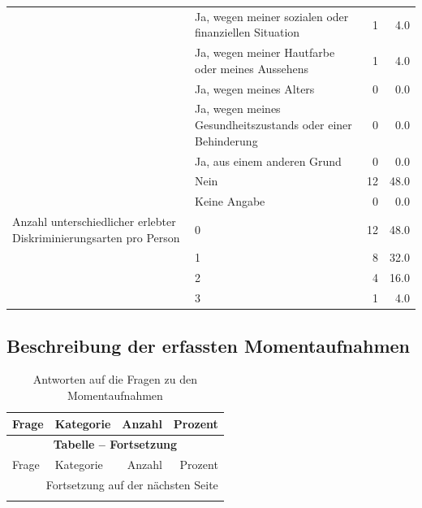 \begin{appendices}
\begin{longtable}{p{5.5cm}p{5.5cm}rr}
     & Ja, wegen meiner sozialen oder finanziellen Situation & 1 & 4.0 \\*
     & Ja, wegen meiner Hautfarbe oder meines Aussehens & 1 & 4.0 \\*
     & Ja, wegen meines Alters & 0 & 0.0 \\*
     & Ja, wegen meines Gesundheitszustands oder einer Behinderung & 0 & 0.0 \\*
     & Ja, aus einem anderen Grund & 0 & 0.0 \\*
     & Nein & 12 & 48.0 \\*
     & Keine Angabe & 0 & 0.0 \\
     \midrule
    \addlinespace
    Anzahl unterschiedlicher erlebter Diskriminierungsarten pro Person & 0 & 12 & 48.0 \\*
     & 1 & 8 & 32.0 \\*
     & 2 & 4 & 16.0 \\*
     & 3 & 1 & 4.0 \\
     \bottomrule
\end{longtable}

\clearpage
\subsection{Beschreibung der erfassten Momentaufnahmen}
\label{sec:appendix_moments}

\begin{longtable}{p{5.5cm}p{5.5cm}rr}
    \caption{Antworten auf die Fragen zu den Momentaufnahmen}
    \label{tab:moments}\\
    \toprule
    Frage & Kategorie & Anzahl & Prozent \\
    \midrule
    \endfirsthead

    \multicolumn{4}{c}{{\bfseries Tabelle \thetable{} -- Fortsetzung}} \\
    \toprule
    Frage & Kategorie & Anzahl & Prozent \\
    \midrule
    \endhead
    
    \midrule
    \multicolumn{4}{r}{Fortsetzung auf der nächsten Seite}\\
    \endfoot
    
    \bottomrule
    \endlastfoot


\end{longtable}
\end{appendices}
